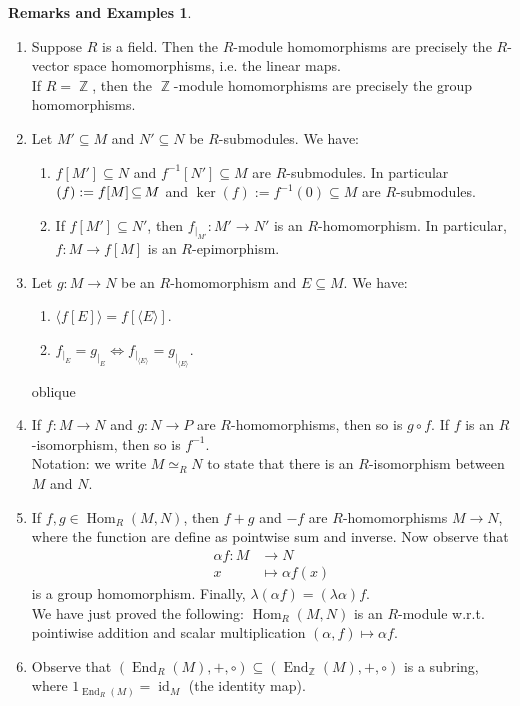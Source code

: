 \documentclass[12pt,a4paper]{report}
\theoremstyle{definition}
\newtheorem*{remex}{Remarks and Examples}
\theoremstyle{num.custom-title}
\DeclareMathOperator{\id}{id}
\let\o\relax %
\DeclareMathOperator{\o}{\mathsf{o}}
\let\Im\relax %
\DeclareMathOperator{\Im}{Im}
\DeclareMathOperator{\Hom}{Hom}
\DeclareMathOperator{\End}{End}
\DeclareMathOperator{\Z}{\mathbb{Z}}
\DeclareMathOperator{\sse}{\subseteq}
\renewcommand{\iff}{\Leftrightarrow}
\begin{document}
\begin{remex}\ 
\begin{enumerate}
\item Suppose $R$ is a field. Then the $R$-module homomorphisms are precisely the $R$-vector space homomorphisms, i.e. the linear maps.\\
If $R=\Z$, then the $\Z$-module homomorphisms are precisely the group homomorphisms.\label{Z-hom=goup_hom}
\item Let $M' \sse M$ and $N' \sse N$ be $R$-submodules. We have:
\begin{enumerate}
\item $f[M'] \sse N$ and $f^{-1}[N'] \sse M$ are $R$-submodules. In particular $\Im(f) := f[M] \sse M$ and $\ker(f) := f^{-1}(0) \sse M$ are $R$-submodules.
\item If $f[M'] \sse N'$, then $f_{|_{M'}} : M' \to N'$ is an $R$-homomorphism. In particular, $f : M \to f[M]$ is an $R$-epimorphism.
\end{enumerate}
\item Let $g : M \to N$ be an $R$-homomorphism and $E \sse M$. We have:
\begin{enumerate}
\item $\langle f[E] \rangle = f[ \langle E \rangle ]$.
\item $f_{|_E} = g_{|_E} \iff f_{|_{\langle E \rangle}} = g_{|_{\langle E \rangle}}$.
\end{enumerate}oblique
\item If $f: M \to N$ and $g: N \to P$ are $R$-homomorphisms, then so is $g \circ f$. If $f$ is an $R$-isomorphism, then so is $f^{-1}$.\\
Notation: we write $M \simeq_R N$ to state that there is an $R$-isomorphism between $M$ and $N$.
\item If $f,g \in \Hom_R(M,N)$, then $f+g$ and $-f$ are $R$-homomorphisms $M \to N$, where the function are define as pointwise sum and inverse. Now observe that
\begin{align*}
\alpha f : M &\to N \\
x &\mapsto \alpha f(x)
\end{align*}
is a group homomorphism. Finally, $\lambda (\alpha f) = (\lambda \alpha) f$.\\
We have just proved the following: $\Hom_R(M,N)$ is an $R$-module w.r.t. pointiwise addition and scalar multiplication $(\alpha,f) \mapsto \alpha f$.
\item Observe that $(\End_R(M),+,\circ) \sse (\End_{\Z}(M),+,\circ)$ is a subring, where $1_{\End_R(M)} = \id_M$ (the identity map).
\end{enumerate}
\end{remex}
\end{document}
